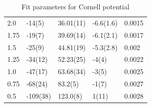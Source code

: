\begin{table}[!hb]
\begin{tabular}{lllll}
   2.0 & -14(5) & 36.01(11) & -6.6(1.6) & 0.0015 \\
   1.75 & -19(7) & 39.69(14) & -6.1(2.1) & 0.0017 \\
   1.5 & -25(9) & 44.81(19) & -5.3(2.8) & 0.002 \\
   1.25 & -34(12) & 52.23(25) & -4(4) & 0.0022 \\
   1.0 & -47(17) & 63.68(34) & -3(5) & 0.0025 \\
   0.75 & -68(24) & 83.2(5) & -1(7) & 0.0027 \\
   0.5 & -109(38) & 123.0(8) & 1(11) & 0.0028 \\
\end{tabular}
\caption{Fit parameters for Cornell potential}
\end{table}
